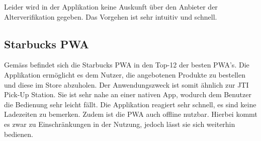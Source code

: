 Leider wird in der Applikation keine Auskunft über den Anbieter der Alterverifikation gegeben. Das Vorgehen ist sehr intuitiv und schnell. 

\subsection{Starbucks \gls{PWA}}
Gemäss \cite{bestPWA} befindet sich die Starbucks \gls{PWA} in den Top-12 der besten \gls{PWA}'s. Die Applikation ermöglicht es dem Nutzer, die angebotenen Produkte zu bestellen und diese im Store abzuholen. Der Anwendungszweck ist somit ähnlich zur JTI Pick-Up Station. Sie ist sehr nahe an einer nativen App, wodurch dem Benutzer die Bedienung sehr leicht fällt. Die Applikation reagiert sehr schnell, es sind keine Ladezeiten zu bemerken. Zudem ist die \gls{PWA} auch offline nutzbar. Hierbei kommt es zwar zu Einschränkungen in der Nutzung, jedoch lässt sie sich weiterhin bedienen. 
